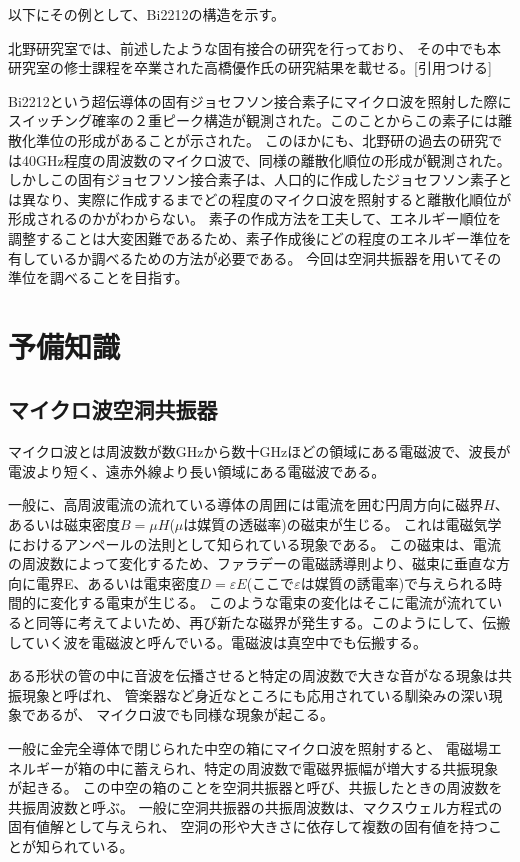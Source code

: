 以下にその例として、Bi2212の構造を示す。

北野研究室では、前述したような固有接合の研究を行っており、
その中でも本研究室の修士課程を卒業された高橋優作氏の研究結果を載せる。[引用つける]

Bi2212という超伝導体の固有ジョセフソン接合素子にマイクロ波を照射した際にスイッチング確率の２重ピーク構造が観測された。このことからこの素子には離散化準位の形成があることが示された。
このほかにも、北野研の過去の研究では40GHz程度の周波数のマイクロ波で、同様の離散化順位の形成が観測された。
しかしこの固有ジョセフソン接合素子は、人口的に作成したジョセフソン素子とは異なり、実際に作成するまでどの程度のマイクロ波を照射すると離散化順位が形成されるのかがわからない。
素子の作成方法を工夫して、エネルギー順位を調整することは大変困難であるため、素子作成後にどの程度のエネルギー準位を有しているか調べるための方法が必要である。
今回は空洞共振器を用いてその準位を調べることを目指す。

\section{予備知識}
\subsection{マイクロ波空洞共振器}
マイクロ波とは周波数が数GHzから数十GHzほどの領域にある電磁波で、波長が電波より短く、遠赤外線より長い領域にある電磁波である。

一般に、高周波電流の流れている導体の周囲には電流を囲む円周方向に磁界$H$、あるいは磁束密度$B =μH$($μ$は媒質の透磁率)の磁束が生じる。
これは電磁気学におけるアンペールの法則として知られている現象である。
この磁束は、電流の周波数によって変化するため、ファラデーの電磁誘導則より、磁束に垂直な方向に電界E、あるいは電束密度$D =εE$(ここで$ε$は媒質の誘電率)で与えられる時間的に変化する電束が生じる。
このような電束の変化はそこに電流が流れていると同等に考えてよいため、再び新たな磁界が発生する。このようにして、伝搬していく波を電磁波と呼んでいる。電磁波は真空中でも伝搬する。

ある形状の管の中に音波を伝播させると特定の周波数で大きな音がなる現象は共振現象と呼ばれ、
管楽器など身近なところにも応用されている馴染みの深い現象であるが、
マイクロ波でも同様な現象が起こる。

一般に金完全導体で閉じられた中空の箱にマイクロ波を照射すると、
電磁場エネルギーが箱の中に蓄えられ、特定の周波数で電磁界振幅が増大する共振現象が起きる。
この中空の箱のことを空洞共振器と呼び、共振したときの周波数を共振周波数と呼ぶ。
一般に空洞共振器の共振周波数は、マクスウェル方程式の固有値解として与えられ、
空洞の形や大きさに依存して複数の固有値を持つことが知られている。

